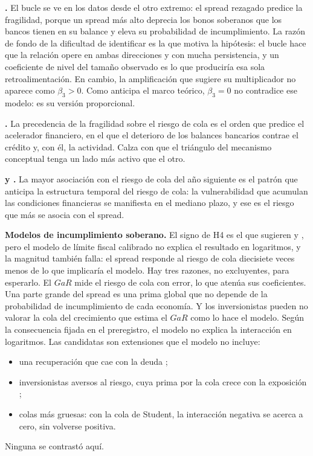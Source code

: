 \textbf{\citet{FarhiTirole2018b}.} El bucle se ve en los datos desde el otro extremo: el spread rezagado predice la fragilidad, porque un spread más alto deprecia los bonos soberanos que los bancos tienen en su balance y eleva su probabilidad de incumplimiento. La razón de fondo de la dificultad de identificar es la que motiva la hipótesis: el bucle hace que la relación opere en ambas direcciones y con mucha persistencia, y un coeficiente de nivel del tamaño observado es lo que produciría esa sola retroalimentación. En cambio, la amplificación que sugiere su multiplicador no aparece como $\beta_3>0$. Como anticipa el marco teórico, $\beta_3=0$ no contradice ese modelo: es su versión proporcional.

\textbf{\citet{BernankeGertlerGilchrist1996}.} La precedencia de la fragilidad sobre el riesgo de cola es el orden que predice el acelerador financiero, en el que el deterioro de los balances bancarios contrae el crédito y, con él, la actividad. Calza con que el triángulo del mecanismo conceptual tenga un lado más activo que el otro.

\textbf{\citet{ABG2019b} y \citet{AdrianEtAl2022}.} La mayor asociación con el riesgo de cola del año siguiente es el patrón que anticipa la estructura temporal del riesgo de cola: la vulnerabilidad que acumulan las condiciones financieras se manifiesta en el mediano plazo, y ese es el riesgo que más se asocia con el spread.

\textbf{Modelos de incumplimiento soberano.} El signo de H4 es el que sugieren \citet{Arellano2008} y \citet{AguiarGopinath2006}, pero el modelo de límite fiscal calibrado no explica el resultado en logaritmos, y la magnitud también falla: el spread responde al riesgo de cola diecisiete veces menos de lo que implicaría el modelo. Hay tres razones, no excluyentes, para esperarlo. El $GaR$ mide el riesgo de cola con error, lo que atenúa sus coeficientes. Una parte grande del spread es una prima global que no depende de la probabilidad de incumplimiento de cada economía. Y los inversionistas pueden no valorar la cola del crecimiento que estima el $GaR$ como lo hace el modelo. Según la consecuencia fijada en el preregistro, el modelo no explica la interacción en logaritmos. Las candidatas son extensiones que el modelo no incluye:
\begin{itemize}
    \item una recuperación que cae con la deuda \citep{Yue2010};
    \item inversionistas aversos al riesgo, cuya prima por la cola crece con la exposición \citep{Lizarazo2013};
    \item colas más gruesas: con la cola de Student, la interacción negativa se acerca a cero, sin volverse positiva.
\end{itemize}
Ninguna se contrastó aquí.

